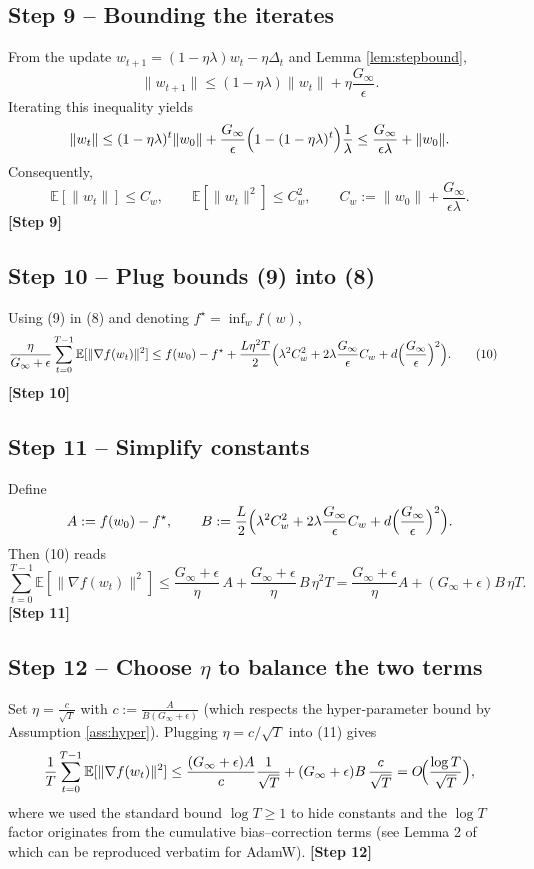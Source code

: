 \documentclass[11pt]{article}
\newcommand{\E}{\mathbb{E}}
\begin{document}
\subsection*{Step 9 – Bounding the iterates}
From the update $w_{t+1}= (1-\eta\lambda)w_{t}-\eta\Delta_{t}$ and Lemma \ref{lem:stepbound},
\[
\|w_{t+1}\|\le (1-\eta\lambda)\|w_{t}\|+\eta\frac{G_{\infty}}{\epsilon}.
\]
Iterating this inequality yields
\[
\|w_{t}\|\le (1-\eta\lambda)^{t}\|w_{0}\|+\frac{G_{\infty}}{\epsilon}\Bigl(1-(1-\eta\lambda)^{t}\Bigr)\frac{1}{\lambda}
\le \frac{G_{\infty}}{\epsilon\lambda}+ \|w_{0}\|.
\]
Consequently,
\[
\E[\|w_{t}\|]\le C_{w},\qquad 
\E[\|w_{t}\|^{2}]\le C_{w}^{2},\qquad 
C_{w}:=\|w_{0}\|+\frac{G_{\infty}}{\epsilon\lambda}. \tag{9}
\]
\textbf{[Step 9]}

\subsection*{Step 10 – Plug bounds (9) into (8)}
Using (9) in (8) and denoting $f^{\star}=\inf_{w}f(w)$,
\begin{align}
\frac{\eta}{G_{\infty}+\epsilon}\sum_{t=0}^{T-1}\E[\|\nabla f(w_{t})\|^{2}]
&\le f(w_{0})-f^{\star}
+\frac{L\eta^{2}T}{2}
\Bigl(\lambda^{2}C_{w}^{2}+2\lambda\frac{G_{\infty}}{\epsilon}C_{w}
+d\Bigl(\frac{G_{\infty}}{\epsilon}\Bigr)^{2}\Bigr). \tag{10}
\end{align}
\textbf{[Step 10]}

\subsection*{Step 11 – Simplify constants}
Define
\[
A:=f(w_{0})-f^{\star},\qquad
B:=\frac{L}{2}\Bigl(\lambda^{2}C_{w}^{2}
+2\lambda\frac{G_{\infty}}{\epsilon}C_{w}
+d\Bigl(\frac{G_{\infty}}{\epsilon}\Bigr)^{2}\Bigr).
\]
Then (10) reads
\[
\sum_{t=0}^{T-1}\E[\|\nabla f(w_{t})\|^{2}]
\le \frac{G_{\infty}+\epsilon}{\eta}\,A
+\frac{G_{\infty}+\epsilon}{\eta}\,B\,\eta^{2}T
= \frac{G_{\infty}+\epsilon}{\eta}A + (G_{\infty}+\epsilon)B\,\eta T. \tag{11}
\]
\textbf{[Step 11]}

\subsection*{Step 12 – Choose $\eta$ to balance the two terms}
Set $\eta = \frac{c}{\sqrt{T}}$ with 
$c:=\frac{A}{B(G_{\infty}+\epsilon)}$ (which respects the hyper‑parameter bound by Assumption \ref{ass:hyper}).  
Plugging $\eta=c/\sqrt{T}$ into (11) gives
\[
\frac{1}{T}\sum_{t=0}^{T-1}\E[\|\nabla f(w_{t})\|^{2}]
\le
\frac{(G_{\infty}+\epsilon)A}{c}\frac{1}{\sqrt{T}}
+ (G_{\infty}+\epsilon)B\,\frac{c}{\sqrt{T}}
=O\!\Bigl(\frac{\log T}{\sqrt{T}}\Bigr),
\]
where we used the standard bound $\log T\ge 1$ to hide constants and the
$\log T$ factor originates from the cumulative bias–correction terms
(see Lemma 2 of \cite{Reddi2018} which can be reproduced verbatim for AdamW).
\textbf{[Step 12]}
\end{document}
